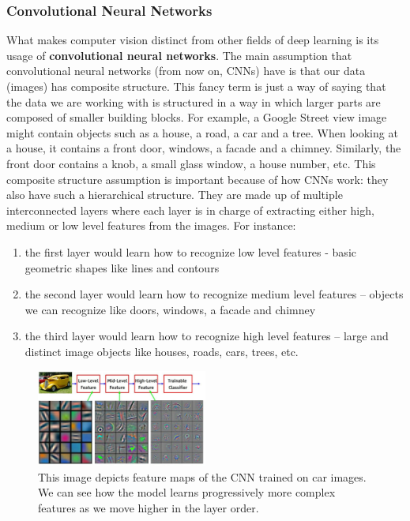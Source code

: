 \documentclass[]{article}
\providecommand{\tightlist}{%
  \setlength{\itemsep}{0pt}\setlength{\parskip}{0pt}}
\begin{document}
\hypertarget{convolutional-neural-networks}{%
\subsubsection{Convolutional Neural
Networks}\label{convolutional-neural-networks}}

What makes computer vision distinct from other fields of deep learning
is its usage of \textbf{convolutional neural networks}. The main
assumption that convolutional neural networks (from now on, CNNs) have
is that our data (images) has composite structure. This fancy term is
just a way of saying that the data we are working with is structured in
a way in which larger parts are composed of smaller building blocks. For
example, a Google Street view image might contain objects such as a
house, a road, a car and a tree. When looking at a house, it contains a
front door, windows, a facade and a chimney. Similarly, the front door
contains a knob, a small glass window, a house number, etc. This
composite structure assumption is important because of how CNNs work:
they also have such a hierarchical structure. They are made up of
multiple interconnected layers where each layer is in charge of
extracting either high, medium or low level features from the images.
For instance:

\begin{enumerate}
\def\labelenumi{\arabic{enumi}.}
\tightlist
\item
  the first layer would learn how to recognize low level features -
  basic geometric shapes like lines and contours
\item
  the second layer would learn how to recognize medium level features --
  objects we can recognize like doors, windows, a facade and chimney
\item
  the third layer would learn how to recognize high level features --
  large and distinct image objects like houses, roads, cars, trees, etc.
\end{enumerate}

\begin{figure}
\centering
\includegraphics[width=0.5\textwidth,height=\textheight]{./tex2pdf.-3ffa51a14b505aec/6da40d961f7413e547ff27942a360fa901bf7ded.png}
\caption{This image depicts feature maps of the CNN trained on car
images. We can see how the model learns progressively more complex
features as we move higher in the layer order.}
\end{figure}
\end{document}
